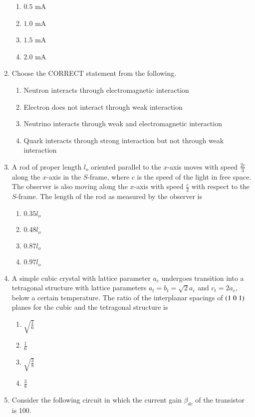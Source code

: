 \documentclass[journal,12pt,onecolumn]{IEEEtran}
\theoremstyle{remark}
\begin{document}
\begin{enumerate}[start=27]
\begin{enumerate}
    \item $0.5$ mA
    \item $1.0$ mA
    \item $1.5$ mA
    \item $2.0$ mA
\end{enumerate}
\item Choose the CORRECT statement from the following.
\begin{enumerate}
    \item Neutron interacts through electromagnetic interaction
    \item Electron does not interact through weak interaction
    \item Neutrino interacts through weak and electromagnetic interaction
    \item Quark interacts through strong interaction but not through weak interaction
\end{enumerate}
\item A rod of proper length $l_o$ oriented parallel to the $x$-axis moves with speed $\frac{2c}{3}$ along the $x$-axis in the $S$-frame, where $c$ is the speed of the light in free space. The observer is also moving along the $x$-axis with speed $\frac{c}{2}$ with respect to the $S$-frame. The length of the rod as measured by the observer is
\begin{enumerate}
    \item $0.35l_o$
    \item $0.48l_o$
    \item $0.87l_o$
    \item $0.97l_o$
\end{enumerate}
\item A simple cubic crystal with lattice parameter $a_c$ undergoes transition into a tetragonal structure with lattice parameters $a_t=b_t=\sqrt{2}a_c$ and $c_t=2a_c$, below a certain temperature. The ratio of the interplanar spacings of $\left(1 \; 0 \; 1\right)$ planes for the cubic and the tetragonal structure is
\begin{enumerate}
    \item $\sqrt{\frac{1}{6}}$
    \item $\frac{1}{6}$
    \item $\sqrt{\frac{3}{8}}$
    \item $\frac{3}{8}$
\end{enumerate}
\item Consider the following circuit in which the current gain $\beta_{dc}$ of the transistor is 100.

\end{enumerate}
\end{document}
